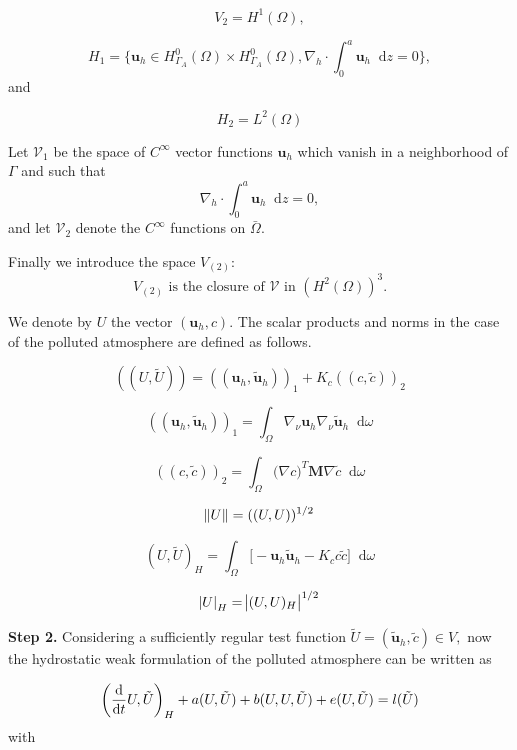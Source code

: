 \documentclass[12pt]{report}
\numberwithin{theorem}{chapter}
\numberwithin{corollary}{chapter}
\numberwithin{lemma}{chapter}
\numberwithin{remark}{chapter}
\numberwithin{definition}{chapter}
\numberwithin{prop}{chapter}
\newcommand*\diff{\mathop{}\!\mathrm{d}}
\begin{document}
$$ V_2 = H^1(\Omega), $$

$$ H_1 =  \{ \mathbf{u}_h \in H^0_{\Gamma_A} (\Omega) \times H^0_{\Gamma_A} (\Omega), \nabla_h \cdot \int_0^a \mathbf{u}_h \diff z = 0  \}, $$
%
and

$$ H_2 = L^2(\Omega) $$

Let $\mathcal{V}_1$ be the space of $C^\infty$ vector functions $\mathbf{u}_h$ which vanish in a neighborhood of $\Gamma$ and such that $$\nabla_h \cdot \int_0^a \mathbf{u}_h \diff z = 0,$$ and let $\mathcal{V}_2$ denote the $C^\infty$ functions on $\bar{\Omega}$.

Finally we introduce the space $V_{(2)}:$
$$ V_{(2)} \text{ is the closure of } \mathcal{V} \text{ in } (H^2(\Omega))^3.$$

We denote by $U$ the vector $(\mathbf{u}_h, c).$ The scalar products and norms in the case of the polluted atmosphere are defined as follows.

\[ ((U, \tilde{U})) = ((\mathbf{u}_h, \mathbf{\tilde{u}}_h))_1 + K_c ((c, \tilde{c}))_2 \]

\[ ((\mathbf{u}_h, \mathbf{\tilde{u}}_h))_1 = \int_\Omega \nabla_\nu \mathbf{u}_h \nabla_\nu \mathbf{\tilde{u}}_h \diff \omega \]

\[ ((c, \tilde{c}))_2 = \int _\Omega \big  (\nabla c)^T \mathbf{M} \nabla \tilde{c} \diff \omega \]

\[\norm{U} = ((U,U)) ^ {1/2}\]

\[ (U, \tilde{U})_H = \int _\Omega \big [ -\mathbf{u}_h \mathbf{\tilde{u}}_h - K_c c \tilde{c} \big ] \diff \omega \]

\[\abs{U}_H = \abs{(U,U)_H}^{1/2}\]

\textbf{Step 2.} Considering a sufficiently regular test function $\tilde{U} = (\mathbf{\tilde{u}}_h, \tilde{c}) \in V,$ now the hydrostatic weak formulation of the polluted atmosphere can be written as

\begin{equation} \label{EXISTENCEFORMAT}
  \bigg ( \frac{\diff}{\diff t} U, \tilde{U} \bigg )_H + a(U, \tilde{U}) + b(U,U,\tilde{U}) + e(U, \tilde{U}) = l(\tilde{U}) \\
\end{equation}
%
with
\end{document}
